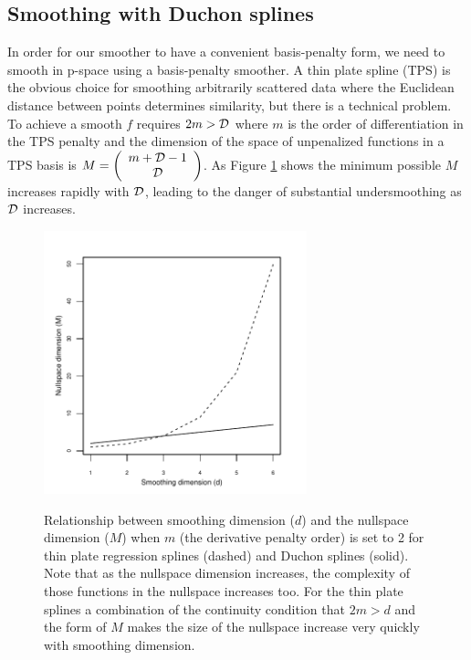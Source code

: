 \documentclass[smallextended]{svjour3}       %
\begin{document}
\subsection{Smoothing with Duchon splines}
\label{ss:duchon}

In order for our smoother to have a convenient basis-penalty form, we need to smooth in p-space using a basis-penalty smoother. A thin plate spline (TPS) is the obvious choice for smoothing arbitrarily scattered data where the Euclidean distance between points determines similarity, but there is a technical problem. To achieve a smooth $f$ requires $2m > {\cal D}$ where $m$ is the order of differentiation in the TPS penalty and the dimension of the space of unpenalized functions in a TPS basis is $M = \left ( \begin{array}{c} m + {\cal D} - 1 \\ {\cal D} \end{array} \right )$. As Figure \ref{nullspace-dim} shows the minimum possible $M$ increases rapidly with $\cal D$, leading to the danger of substantial undersmoothing as $\cal D$ increases.

\begin{figure}
\centering
\includegraphics[width=3in]{figs/nullspace-dim.pdf} \\
\caption{Relationship between smoothing dimension ($d$) and the nullspace dimension ($M$) when $m$ (the derivative penalty order) is set to 2 for thin plate regression splines (dashed) and Duchon splines (solid). Note that as the nullspace dimension increases, the complexity of those functions in the nullspace increases too. For the thin plate splines a combination of the continuity condition that $2m>d$ and the form of $M$ makes the size of the nullspace increase very quickly with smoothing dimension.}
\label{nullspace-dim}
\end{figure}
\end{document}
